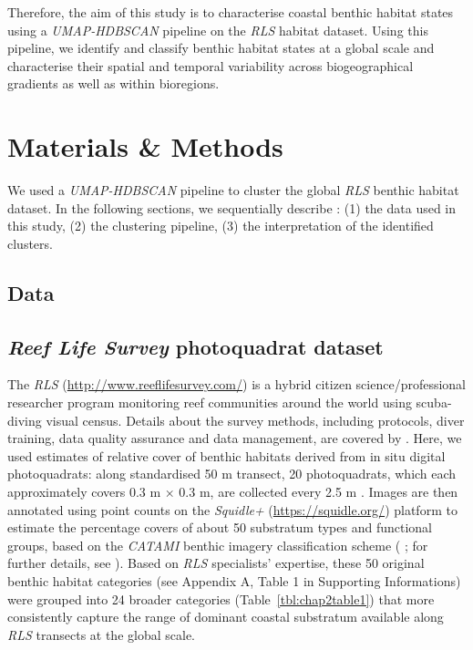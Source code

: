 \begin{refsection}
Therefore, the aim of this study is to characterise coastal benthic
habitat states using a \emph{UMAP-HDBSCAN} pipeline on the \emph{RLS}
habitat dataset. Using this pipeline, we identify and classify benthic
habitat states at a global scale and characterise their spatial and
temporal variability across biogeographical gradients as well as within
bioregions.

\clearpage

\hypertarget{mat-met-chapt2}{%
\section{Materials \& Methods}\label{mat-met-chapt2}}

We used a \emph{UMAP-HDBSCAN} pipeline to cluster the global \emph{RLS}
benthic habitat dataset. In the following sections, we sequentially
describe : (1) the data used in this study, (2) the clustering pipeline,
(3) the interpretation of the identified clusters.

\hypertarget{data}{%
\subsection{Data}\label{data}}

\hypertarget{reef-life-survey-photoquadrat-dataset}{%
\subsection{\texorpdfstring{\emph{Reef Life Survey} photoquadrat
dataset}{Reef Life Survey photoquadrat dataset}}\label{reef-life-survey-photoquadrat-dataset}}

The \emph{RLS} (\url{http://www.reeflifesurvey.com/}) is a hybrid
citizen science/professional researcher program monitoring reef
communities around the world using scuba-diving visual census. Details
about the survey methods, including protocols, diver training, data
quality assurance and data management, are covered by
\textcite{Edgar_2014}. Here, we used estimates of relative cover of
benthic habitats derived from in situ digital photoquadrats: along
standardised 50 m transect, 20 photoquadrats, which each approximately
covers 0.3 m × 0.3 m, are collected every 2.5 m \autocite{Edgar_2020}.
Images are then annotated using point counts on the \emph{Squidle+}
(\url{https://squidle.org/}) platform to estimate the percentage covers
of about 50 substratum types and functional groups, based on the
\emph{CATAMI} benthic imagery classification scheme
(\textcite{Althaus_2015} ; for further details, see
\textcite{Edgar_2020}). Based on \emph{RLS} specialists' expertise,
these 50 original benthic habitat categories (see Appendix A, Table 1 in
Supporting Informations) were grouped into 24 broader categories
(Table~\ref{tbl:chap2table1}) that more consistently capture the range
of dominant coastal substratum available along \emph{RLS} transects at
the global scale.


\end{refsection}
